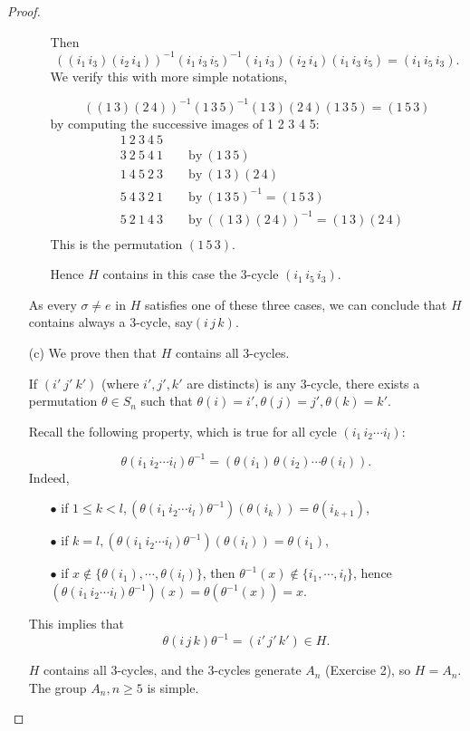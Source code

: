 \documentclass[11pt,a4paper]{article}
\newcommand{\be} {\begin{enumerate}}
\newcommand{\ee} {\end{enumerate}}
\begin{document}
\begin{proof}
\begin{enumerate}
\begin{enumerate}
Then
$$((i_1\,i_3)(i_2\,i_4))^{-1} (i_1\, i_3\, i_5)^{-1} (i_1\,i_3)(i_2\,i_4) (i_1\, i_3\, i_5) = (i_1\, i_5\, i_3).$$
We verify this with more simple notations,

$$((1\, 3)(2\, 4))^{-1}(1\, 3\, 5)^{-1} (1\, 3)( 2 \,4 ) (1\, 3\, 5) = (1\, 5\, 3)$$
by computing the successive images of 1 2 3 4 5:
\begin{align*}
&1\ 2\ 3\ 4\ 5\\
&3\ 2\ 5\ 4\ 1 \qquad \mathrm{by}\ (1\, 3\, 5)\\
&1\ 4\ 5\ 2\ 3  \qquad \mathrm{by}\ (1\, 3)( 2 \,4 ) \\
&5\ 4\ 3\ 2\ 1  \qquad \mathrm{by}\ (1\, 3\, 5)^{-1} =(1\, 5\, 3) \\
&5\ 2\ 1\ 4\ 3  \qquad \mathrm{by}\ ((1\, 3)( 2 \,4 ))^{-1} =(1\, 3)( 2 \,4 ) \\
\end{align*}
This is the permutation $(1\, 5\, 3)$.

Hence $H$ contains in this case the 3-cycle $ (i_1\, i_5\, i_3)$.
\end{enumerate}
As every $\sigma \neq e$ in $H$ satisfies one of these three cases, we can conclude that $H$ contains always a 3-cycle, say$(i\,j\,k)$.

\item[(c)] We prove then that $H$ contains all 3-cycles.

If $(i'\ j'\ k')$ (where $i',j',k'$ are distincts) is any 3-cycle, there exists a permutation $\theta \in S_n$ such that $\theta(i) = i',\theta(j) = j', \theta(k)=k'$.

Recall the following property, which is true for all cycle $(i_1\, i_2\cdots i_l)$:

$$\theta (i_1\, i_2\cdots i_l) \theta^{-1} = (\theta(i_1)\, \theta(i_2)\cdots \theta(i_l)).$$
Indeed,
\be
\item[$\bullet$] if $1\leq k < l,(\theta (i_1\, i_2\cdots i_l) \theta^{-1})(\theta(i_k)) = \theta(i_{k+1})$,

\item[$\bullet$] if $k=l,(\theta (i_1\, i_2\cdots i_l) \theta^{-1})(\theta(i_l)) = \theta(i_{1})$,

\item[$\bullet$] if $x \not \in \{\theta(i_1),\cdots,\theta(i_l)\}$, then $\theta^{-1}(x) \not \in \{i_1,\cdots,i_l\}$, hence
$(\theta (i_1\, i_2\cdots i_l) \theta^{-1})(x) = \theta(\theta^{-1}(x) )= x$.
\ee
This implies that
$$\theta (i\,j\,k) \theta^{-1}= (i' \, j'\, k') \in H.$$

$H$ contains all 3-cycles, and the 3-cycles generate $A_n$ (Exercise 2), so $H = A_n$. The group $A_n,n\geq 5$ is simple.
\end{enumerate}
\end{proof}
\end{document}
